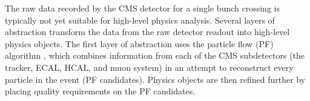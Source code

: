 The raw data recorded by the CMS detector for a single bunch crossing is typically not yet suitable for high-level physics analysis.
Several layers of abstraction transform the data from the raw detector readout into high-level physics objects.
The first layer of abstraction uses the particle flow (PF) algorithm \cite{particle_flow}, which combines information from each of the CMS subdetectors (the tracker, ECAL, HCAL, and muon system) in an attempt to reconstruct every particle in the event (PF candidates).
Physics objects are then refined further by placing quality requirements on the PF candidates.
